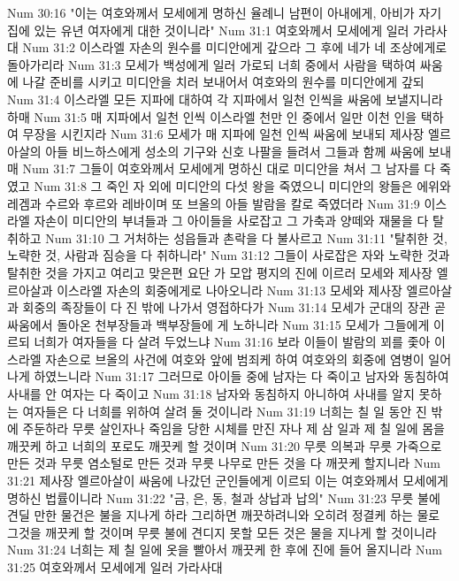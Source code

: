 Num 30:16  "이는 여호와께서 모세에게 명하신 율례니 남편이 아내에게, 아비가 자기 집에 있는 유년 여자에게 대한 것이니라"
Num 31:1  여호와께서 모세에게 일러 가라사대
Num 31:2  이스라엘 자손의 원수를 미디안에게 갚으라 그 후에 네가 네 조상에게로 돌아가리라
Num 31:3  모세가 백성에게 일러 가로되 너희 중에서 사람을 택하여 싸움에 나갈 준비를 시키고 미디안을 치러 보내어서 여호와의 원수를 미디안에게 갚되
Num 31:4  이스라엘 모든 지파에 대하여 각 지파에서 일천 인씩을 싸움에 보낼지니라 하매
Num 31:5  매 지파에서 일천 인씩 이스라엘 천만 인 중에서 일만 이천 인을 택하여 무장을 시킨지라
Num 31:6  모세가 매 지파에 일천 인씩 싸움에 보내되 제사장 엘르아살의 아들 비느하스에게 성소의 기구와 신호 나팔을 들려서 그들과 함께 싸움에 보내매
Num 31:7  그들이 여호와께서 모세에게 명하신 대로 미디안을 쳐서 그 남자를 다 죽였고
Num 31:8  그 죽인 자 외에 미디안의 다섯 왕을 죽였으니 미디안의 왕들은 에위와 레겜과 수르와 후르와 레바이며 또 브올의 아들 발람을 칼로 죽였더라
Num 31:9  이스라엘 자손이 미디안의 부녀들과 그 아이들을 사로잡고 그 가축과 양떼와 재물을 다 탈취하고
Num 31:10  그 거처하는 성읍들과 촌락을 다 불사르고
Num 31:11  "탈취한 것, 노략한 것, 사람과 짐승을 다 취하니라"
Num 31:12  그들이 사로잡은 자와 노략한 것과 탈취한 것을 가지고 여리고 맞은편 요단 가 모압 평지의 진에 이르러 모세와 제사장 엘르아살과 이스라엘 자손의 회중에게로 나아오니라
Num 31:13  모세와 제사장 엘르아살과 회중의 족장들이 다 진 밖에 나가서 영접하다가
Num 31:14  모세가 군대의 장관 곧 싸움에서 돌아온 천부장들과 백부장들에 게 노하니라
Num 31:15  모세가 그들에게 이르되 너희가 여자들을 다 살려 두었느냐
Num 31:16  보라 이들이 발람의 꾀를 좇아 이스라엘 자손으로 브올의 사건에 여호와 앞에 범죄케 하여 여호와의 회중에 염병이 일어나게 하였느니라
Num 31:17  그러므로 아이들 중에 남자는 다 죽이고 남자와 동침하여 사내를 안 여자는 다 죽이고
Num 31:18  남자와 동침하지 아니하여 사내를 알지 못하는 여자들은 다 너희를 위하여 살려 둘 것이니라
Num 31:19  너희는 칠 일 동안 진 밖에 주둔하라 무릇 살인자나 죽임을 당한 시체를 만진 자나 제 삼 일과 제 칠 일에 몸을 깨끗케 하고 너희의 포로도 깨끗케 할 것이며
Num 31:20  무릇 의복과 무릇 가죽으로 만든 것과 무릇 염소털로 만든 것과 무릇 나무로 만든 것을 다 깨끗케 할지니라
Num 31:21  제사장 엘르아살이 싸움에 나갔던 군인들에게 이르되 이는 여호와께서 모세에게 명하신 법률이니라
Num 31:22  "금, 은, 동, 철과 상납과 납의"
Num 31:23  무릇 불에 견딜 만한 물건은 불을 지나게 하라 그리하면 깨끗하려니와 오히려 정결케 하는 물로 그것을 깨끗케 할 것이며 무릇 불에 견디지 못할 모든 것은 물을 지나게 할 것이니라
Num 31:24  너희는 제 칠 일에 옷을 빨아서 깨끗케 한 후에 진에 들어 올지니라
Num 31:25  여호와께서 모세에게 일러 가라사대
